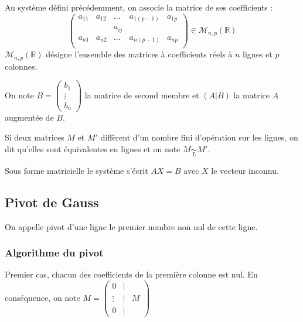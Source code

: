\begin{defi}{}
Au système défini précédemment, on associe la matrice de ses coefficients :
$$
\begin{pmatrix}
a_{11} & a_{12} & \ldots & a_{1(p-1)} & a_{1p} \\
 & & a_{ij} & & \\
a_{n1} & a_{n2} & \ldots & a_{n(p-1)} & a_{np} \\
\end{pmatrix} \in \mathcal{M}_{n,p}(\mathbb{R})
$$
$\mathcal{M}_{n,p}(\mathbb{R})$ désigne l'ensemble des matrices à coefficients réels à $n$ lignes et $p$ colonnes. 
\end{defi}

\begin{defi}{}
On note $B=\begin{pmatrix} b_1 \\ \vdots \\ b_n \end{pmatrix}$ la matrice de second membre et $(A|B)$ la matrice $A$ augmentée de $B$. 
\end{defi}


\begin{defi}{}
Si deux matrices $M$ et $M'$ diffèrent d'un nombre fini d'opération sur les lignes, on dit qu'elles sont équivalentes en lignes et on note $M \underset{L}{\sim} M'$. 
\end{defi}

\begin{remarque}
Sous forme matricielle le système s'écrit $AX=B$ avec $X$ le vecteur inconnu. 
\end{remarque}


\subsection{Pivot de Gauss}
\begin{defi}
On appelle pivot d'une ligne le premier nombre non nul de cette ligne. 
\end{defi}

\subsubsection{Algorithme du pivot}
Premier cas, chacun des coefficients de la première colonne est nul. En conséquence, on note 
$M = \begin{pmatrix} 0 & | &  \\ \vdots & | & M \\ 0 & | &  \end{pmatrix}$ 

